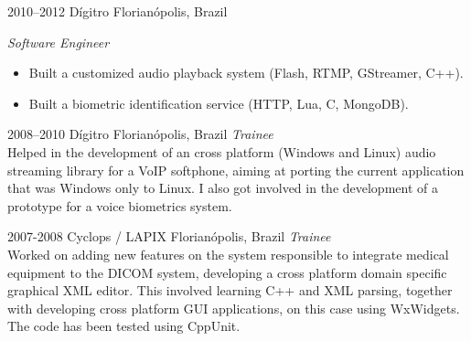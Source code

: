 \documentclass[]{friggeri-cv} %
\begin{document}
\begin{entrylist}
\entry
{2010--2012}
{Dígitro}
{Florianópolis, Brazil}
{\emph{Software Engineer} \\

\begin{itemize}
  \item Built a customized audio playback system (Flash, RTMP, GStreamer, C++).
  \item Built a biometric identification service (HTTP, Lua, C, MongoDB).
\end{itemize}
}
\end{entrylist}
\begin{entrylist}
\entry
{2008--2010}
{Dígitro}
{Florianópolis, Brazil}
{\emph{Trainee} \\

Helped in the development of an
cross platform (Windows and Linux) audio streaming
library for a VoIP softphone, aiming at porting
the current application that was Windows only to Linux. I also
got involved in the development of a prototype for a voice
biometrics system.
}
\end{entrylist}
\begin{entrylist}
\entry
{2007-2008}
{Cyclops / LAPIX}
{Florianópolis, Brazil}
{\emph{Trainee} \\

Worked on adding new features on the system responsible to
integrate medical equipment to the DICOM system, developing a
cross platform domain specific graphical XML editor.
This involved learning C++ and XML parsing, together with
developing cross platform GUI applications, on this case
using WxWidgets. The code has been tested using CppUnit.
}
\end{entrylist}
\end{document}
